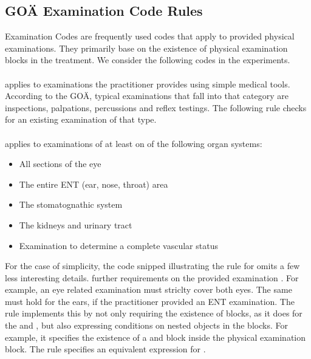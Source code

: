 \subsection{GOÄ Examination Code Rules}\label{subsec:examination-code-rules}
Examination Codes are frequently used codes that apply to provided physical examinations.
They primarily base on the existence of physical examination blocks in the treatment.
We consider the following codes in the experiments.

\paragraph{}
 applies to examinations the practitioner provides using simple medical tools.
According to the GOÄ, typical examinations that fall into that category are inspections, palpations, percussions and reflex testings.
The following rule checks for an existing examination of that type.


\paragraph{}
 applies to examinations of at least on of the following organ systems:
\begin{itemize}
    \item All sections of the eye
    \item The entire ENT (ear, nose, throat) area
    \item The stomatognathic system
    \item The kidneys and urinary tract
    \item Examination to determine a complete vascular status
\end{itemize}
For the case of simplicity, the code snipped illustrating the rule for  omits a few less interesting details.
 further requirements on the provided examination \cite{bruck1998kommentar}.
For example, an eye related examination must striclty cover both eyes.
The same must hold for the ears, if the practitioner provided an ENT examination.
The rule implements this by not only requiring the existence of blocks, as it does for the  and ,
but also expressing conditions on nested objects in the blocks.
For example, it specifies the existence of a  and  block inside the  physical examination block.
The rule specifies an equivalent expression for .

